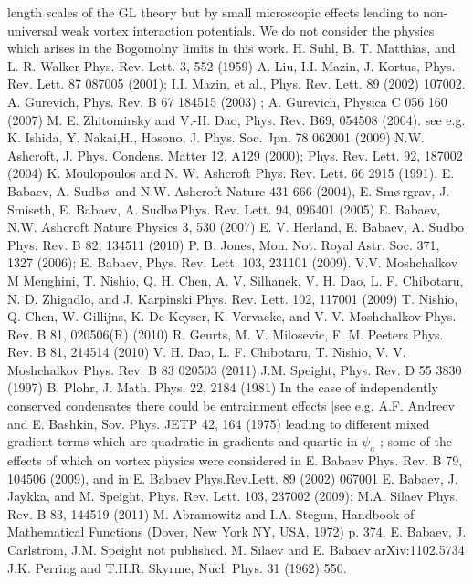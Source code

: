 \begin{thebibliography}{99}
        length scales of the GL theory but by small microscopic effects 
        leading to non-universal weak vortex interaction potentials. We do not 
        consider the physics which arises in the Bogomolny limits in this work.
     H. Suhl, B. T. Matthias, and L. R. Walker Phys. Rev. 
        Lett. 3, 552 (1959)
     A. Liu, I.I. Mazin, J. Kortus, Phys. Rev. Lett. 87 087005 
        (2001); I.I. Mazin, et al., Phys. Rev. Lett. 89 (2002) 107002.
     A. Gurevich, Phys. Rev. B 67 184515 (2003) ;
     A. Gurevich, Physica C 056 160 (2007)
     M. E. Zhitomirsky and V.-H. Dao, Phys. Rev. B69, 054508 
        (2004).
     see e.g. K. Ishida, Y. Nakai,H., Hosono, J. Phys. Soc. 
        Jpn. 78 062001 (2009)
     N.W. Ashcroft, J. Phys. Condens. Matter 12, A129 (2000); 
        Phys. Rev. Lett. 92, 187002 (2004) K. Moulopoulos and N. W. Ashcroft 
        Phys. Rev. Lett. 66 2915 (1991),
     E. Babaev, A. Sudb\o\,\! and N.W. Ashcroft Nature 431 666 
        (2004), E. Sm\o\,\!rgrav, J. Smiseth, E. Babaev, A. Sudb\o\,\!Phys. 
        Rev. Lett. 94, 096401 (2005) E. Babaev, N.W. Ashcroft Nature Physics 
        3, 530 (2007)
     E. V. Herland, E. Babaev, A. Sudbo Phys. Rev. B 82, 
        134511 (2010)
     P. B. Jones, Mon. Not. Royal Astr. Soc. 371, 1327 (2006); 
        E. Babaev, Phys. Rev. Lett. 103, 231101 (2009).
     V.V. Moshchalkov M Menghini, T. Nishio, Q. H. Chen, A. V. 
        Silhanek, V. H. Dao, L. F. Chibotaru, N. D. Zhigadlo, and J. Karpinski 
        Phys. Rev. Lett. 102, 117001 (2009)
     T. Nishio, Q. Chen, W. Gillijns, K. De Keyser, 
        K. Vervaeke, and V. V. Moshchalkov Phys. Rev. B 81, 020506(R) (2010)
     R. Geurts, M. V. Milosevic, F. M. Peeters Phys. Rev. 
        B 81, 214514 (2010) V. H. Dao, L. F. Chibotaru, T. Nishio, V. V. 
        Moshchalkov Phys. Rev. B 83 020503 (2011)
     J.M. Speight, Phys. Rev. D 55 3830 (1997)
     B. Plohr, J. Math. Phys. 22, 2184 (1981)
     In the case of independently conserved condensates there 
        could be entrainment effects [see e.g. A.F. Andreev and E. Bashkin, 
        Sov. Phys. JETP 42, 164 (1975) leading to different mixed gradient 
        terms which are quadratic in gradients and quartic in \( \psi_a \) ; 
        some of the effects of which on vortex physics were considered in 
        E. Babaev Phys. Rev. B 79, 104506 (2009), and in\cite{bib:14}
     E. Babaev Phys.Rev.Lett. 89 (2002) 067001 E. Babaev, 
        J. Jaykka, and M. Speight, Phys. Rev. Lett. 103, 237002 (2009); 
        M.A. Silaev Phys. Rev. B 83, 144519 (2011)
     M. Abramowitz and I.A. Stegun, Handbook of Mathematical 
        Functions (Dover, New York NY, USA, 1972) p. 374.
     E. Babaev, J. Carlstrom, J.M. Speight not published.
     M. Silaev and E. Babaev arXiv:1102.5734
     J.K. Perring and T.H.R. Skyrme, Nucl. Phys. 31 (1962) 550.
\end{thebibliography}

\newpage
